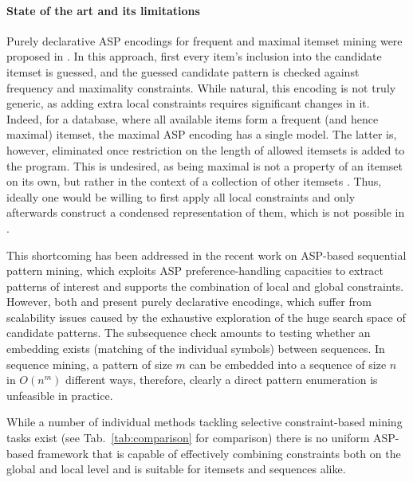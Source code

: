 \paragraph{State of the art and its limitations} Purely declarative ASP encodings for frequent and maximal itemset mining were proposed in \parencite{DBLP:conf/lpnmr/Jarvisalo11}. In this approach, first every item's inclusion into the candidate itemset is guessed, and the guessed candidate pattern is checked against frequency and maximality constraints. While natural, this encoding is not  truly generic, as adding extra local constraints requires significant changes in it. Indeed, for a database, where all available items form a frequent (and hence maximal) itemset, the maximal ASP encoding has a single model. The latter is, however, eliminated once restriction on the length of allowed itemsets is added to the program. This is undesired, as being maximal
is not a  property of an itemset on its own, but rather %
in the context of a collection of other itemsets \parencite{DBLP:journals/kais/BonchiL06}. Thus, ideally one would be willing to first apply all local constraints and only afterwards construct a condensed representation of them, which is not possible in \parencite{DBLP:conf/lpnmr/Jarvisalo11}. %

This shortcoming has been addressed in the recent work \parencite{DBLP:conf/ijcai/GebserGQ0S16} on ASP-based sequential pattern mining, which exploits ASP preference-handling capacities to extract patterns of interest and supports the combination of local and global constraints. However, both \parencite{DBLP:conf/ijcai/GebserGQ0S16} and \parencite{DBLP:conf/lpnmr/Jarvisalo11} present %
purely declarative encodings, which suffer from scalability issues caused by the exhaustive exploration of the huge search space of candidate patterns. The subsequence check amounts to testing whether an embedding exists (matching of the individual symbols) between sequences. In sequence mining, a pattern of size $m$ can be embedded into a sequence of size $n$ in $O(n^m)$ different ways, therefore, clearly a direct pattern enumeration is unfeasible in practice. 

While a number of individual methods tackling selective constraint-based mining tasks exist (see Tab.~\ref{tab:comparison} for comparison) there is no uniform ASP-based framework that is capable of effectively combining constraints both on the global and local level and is suitable for itemsets and sequences alike.

